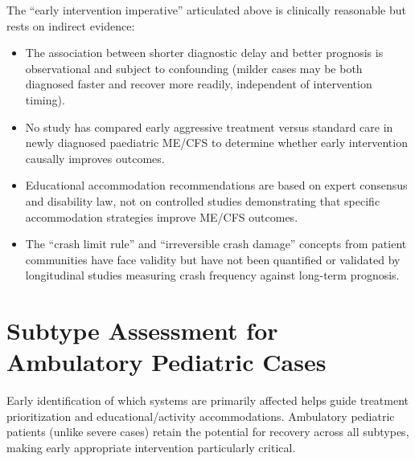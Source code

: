 \begin{limitation}
The ``early intervention imperative'' articulated above is clinically reasonable but rests on indirect evidence:
\begin{itemize}
    \item The association between shorter diagnostic delay and better prognosis is observational and subject to confounding (milder cases may be both diagnosed faster and recover more readily, independent of intervention timing).
    \item No study has compared early aggressive treatment versus standard care in newly diagnosed paediatric ME/CFS to determine whether early intervention causally improves outcomes.
    \item Educational accommodation recommendations are based on expert consensus and disability law, not on controlled studies demonstrating that specific accommodation strategies improve ME/CFS outcomes.
    \item The ``crash limit rule'' and ``irreversible crash damage'' concepts from patient communities have face validity but have not been quantified or validated by longitudinal studies measuring crash frequency against long-term prognosis.
\end{itemize}
\end{limitation}

\section{Subtype Assessment for Ambulatory Pediatric Cases}
\label{sec:ped-ambulatory-subtype}

Early identification of which systems are primarily affected helps guide treatment prioritization and educational/activity accommodations. Ambulatory pediatric patients (unlike severe cases) retain the potential for recovery across all subtypes, making early appropriate intervention particularly critical.


